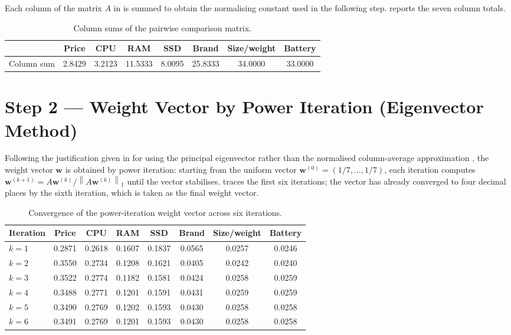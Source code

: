 Each column of the matrix $A$ in  is summed to obtain the normalising
constant used in the following step.  reports the seven column
totals.

\begin{table}[htbp]
  \centering
  \caption{Column sums of the pairwise comparison matrix.}
  \label{tab:ahp-colsum}
  \begin{tabular}{@{}lccccccc@{}}
    \toprule
     & \textbf{Price} & \textbf{CPU} & \textbf{RAM} & \textbf{SSD} & \textbf{Brand} & \textbf{Size/weight} & \textbf{Battery} \\
    \midrule
    Column sum & 2.8429 & 3.2123 & 11.5333 & 8.0095 & 25.8333 & 34.0000 & 33.0000 \\
    \bottomrule
  \end{tabular}
\end{table}

\section{Step 2 --- Weight Vector by Power Iteration (Eigenvector Method)}\label{app:ahp-step2}

Following the justification given in  for using the principal eigenvector
rather than the normalised column-average approximation
\parencite{saaty_decisionmaking_2003,ishizaka_how_2006}, the weight vector $\mathbf{w}$ is
obtained by power iteration: starting from the uniform vector
$\mathbf{w}^{(0)} = (1/7, \dots, 1/7)$, each iteration computes
$\mathbf{w}^{(k+1)} = A\mathbf{w}^{(k)} / \left\lVert A\mathbf{w}^{(k)} \right\rVert_1$
until the vector stabilises.  traces the first six iterations;
the vector has already converged to four decimal places by the sixth iteration, which is
taken as the final weight vector.

\begin{table}[htbp]
  \centering
  \caption{Convergence of the power-iteration weight vector across six iterations.}
  \label{tab:ahp-iterations}
  \begin{tabular}{@{}lccccccc@{}}
    \toprule
    \textbf{Iteration} & \textbf{Price} & \textbf{CPU} & \textbf{RAM} & \textbf{SSD} & \textbf{Brand} & \textbf{Size/weight} & \textbf{Battery} \\
    \midrule
    $k=1$ & 0.2871 & 0.2618 & 0.1607 & 0.1837 & 0.0565 & 0.0257 & 0.0246 \\
    $k=2$ & 0.3550 & 0.2734 & 0.1208 & 0.1621 & 0.0405 & 0.0242 & 0.0240 \\
    $k=3$ & 0.3522 & 0.2774 & 0.1182 & 0.1581 & 0.0424 & 0.0258 & 0.0259 \\
    $k=4$ & 0.3488 & 0.2771 & 0.1201 & 0.1591 & 0.0431 & 0.0259 & 0.0259 \\
    $k=5$ & 0.3490 & 0.2769 & 0.1202 & 0.1593 & 0.0430 & 0.0258 & 0.0258 \\
    $k=6$ & 0.3491 & 0.2769 & 0.1201 & 0.1593 & 0.0430 & 0.0258 & 0.0258 \\
    \bottomrule
  \end{tabular}
\end{table}


